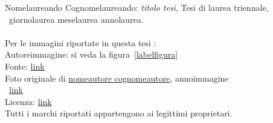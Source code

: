 \hfill
\vfill
\noindent Nomelaureando Cognomelaureando: \textit{titolo tesi}, Tesi di laurea triennale, \textrm{\textcopyright}~giornolaurea meselaurea annolaurea.\\\\

\noindent Per le immagini riportate in questa tesi :\\

\noindent Autoreimmagine: si veda la figura~\vref{labelfigura}\\
\noindent Fonte: \url{link}\\
\noindent Foto originale di \href{link}{nomeautore cognomeautore}, annoimmagine\\
\noindent \textrm{\textcopyright}~\url{link}\\
\noindent Licenza: \url{link}\\

\noindent Tutti i marchi riportati appartengono ai legittimi proprietari.